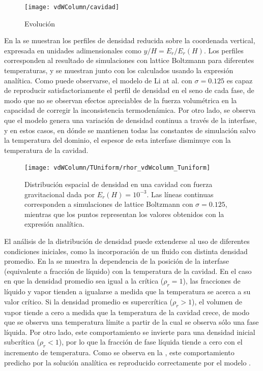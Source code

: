 \begin{figure}[ht]
	\centering
	\texttt{[image: vdWColumn/cavidad]}
	\caption{Evoluci\'on}
	\label{fig:vdWColumn_evolucion}
\end{figure}

En la  se muestran los perfiles de densidad reducida sobre la coordenada vertical, expresada en unidades adimensionales como $y/H = E_r/E_r(H)$. Los perfiles corresponden al resultado de simulaciones con lattice Boltzmann para diferentes temperaturas, y se muestran junto con los calculados usando la expresi\'on anal\'itica. Como puede observarse, el modelo \pp{} de Li at al. con $\sigma=0.125$ es capaz de reproducir satisfactoriamente el perfil de densidad en el seno de cada fase, de modo que no se observan efectos apreciables de la fuerza volum\'etrica en la capacidad de corregir la inconsistencia termoden\'amica. Por otro lado, se observa que el modelo genera una variaci\'on de densidad continua a trav\'es de la interfase, y en estos casos, en d\'onde se mantienen todas las constantes de simulaci\'on salvo la temperatura del dominio, el espesor de esta interfase disminuye con la temperatura de la cavidad.

\begin{figure}[ht]
	\centering
	\texttt{[image: vdWColumn/TUniform/rhor\_vdWcolumn\_Tuniform]}
	\caption{Distribuci\'on espacial de densidad en una cavidad con fuerza gravitacional dada por $E_r(H)=10^{-3}$. Las l\'ineas continuas corresponden a simulaciones de lattice Boltzmann con $\sigma=0.125$, mientras que los puntos representan los valores obtenidos con la expresi\'on anal\'itica.}
	\label{fig:vdWColumn_rhor_tuniform}
\end{figure}

El an\'alisis de la distribuci\'on de densidad puede extenderse al uso de diferentes condiciones iniciales, como la incorporaci\'on de un fluido con distinta densidad promedio. En la  se muestra la dependencia de la posici\'on de la interfase (equivalente a fracci\'on de l\'iquido) con la temperatura de la cavidad. En el caso en que la densidad promedio sea igual a la cr\'itica ($\rho_r=1$), las fracciones de l\'iquido y vapor tienden a igualarse a medida que la temperatura se acerca a su valor cr\'itico. Si la densidad promedio es supercr\'itica ($\rho_r > 1$), el volumen de vapor tiende a cero a medida que la temperatura de la cavidad crece, de modo que se observa una temperatura l\'imite a partir de la cual se observa s\'olo una fase l\'iquida. Por otro lado, este comportamiento se invierte para una densidad inicial subcr\'itica ($\rho_r < 1$), por lo que la fracci\'on de fase l\'iquida tiende a cero con el incremento de temperatura. Como se observa en la , este comportamiento predicho por la soluci\'on anal\'itica es reproducido correctamente por el modelo \pp{}.

